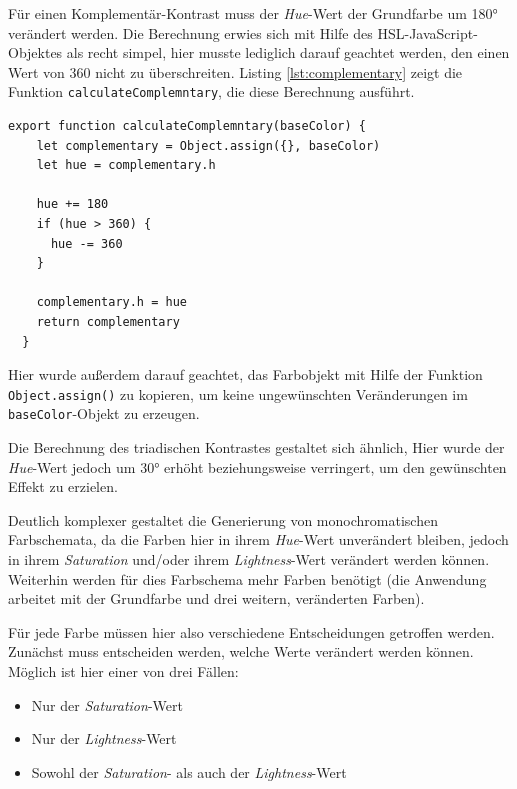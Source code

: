 
Für einen Komplementär-Kontrast muss der \textit{Hue}-Wert der Grundfarbe um 180° verändert werden. Die Berechnung erwies sich mit Hilfe des HSL-JavaScript-Objektes als recht simpel, hier musste lediglich darauf geachtet werden, den einen Wert von 360 nicht zu überschreiten. Listing \ref{lst:complementary} zeigt die Funktion \verb|calculateComplemntary|, die diese Berechnung ausführt.

\begin{lstlisting}[caption=Berechnung eines Komplementär-Kontrastes, label=lst:complementary]
  export function calculateComplemntary(baseColor) {
    let complementary = Object.assign({}, baseColor)
    let hue = complementary.h

    hue += 180
    if (hue > 360) {
      hue -= 360
    }

    complementary.h = hue
    return complementary
  }
\end{lstlisting}

Hier wurde außerdem darauf geachtet, das Farbobjekt mit Hilfe der Funktion \verb|Object.assign()| zu kopieren, um keine ungewünschten Veränderungen im \verb|baseColor|-Objekt zu erzeugen\footnotemark{}.


Die Berechnung des triadischen Kontrastes gestaltet sich ähnlich, Hier wurde der \textit{Hue}-Wert jedoch um 30° erhöht beziehungsweise verringert, um den gewünschten Effekt zu erzielen.

Deutlich komplexer gestaltet die Generierung von monochromatischen Farbschemata, da die Farben hier in ihrem \textit{Hue}-Wert unverändert bleiben, jedoch in ihrem \textit{Saturation} und/oder ihrem \textit{Lightness}-Wert verändert werden können. Weiterhin werden für dies Farbschema mehr Farben benötigt (die Anwendung arbeitet mit der Grundfarbe und drei weitern, veränderten Farben).

Für jede Farbe müssen hier also verschiedene Entscheidungen getroffen werden. Zunächst muss entscheiden werden, welche Werte verändert werden können. Möglich ist hier einer von drei Fällen:

\begin{itemize}
  \item Nur der \textit{Saturation}-Wert
  \item Nur der \textit{Lightness}-Wert
  \item Sowohl der \textit{Saturation}- als auch der \textit{Lightness}-Wert
\end{itemize}

